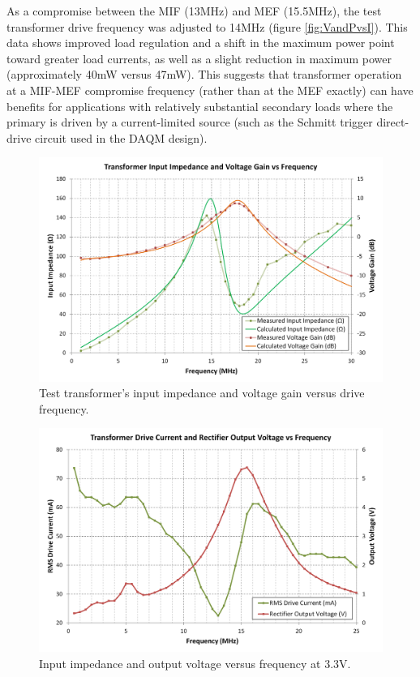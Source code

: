 \documentclass[conference]{IEEEtran}
\begin{document}
	As a compromise between the MIF (13MHz) and MEF (15.5MHz), the test transformer drive frequency was adjusted to 14MHz (figure \ref{fig:VandPvsI}).  This data shows improved load regulation and a shift in the maximum power point toward greater load currents, as well as a slight reduction in maximum power (approximately 40mW versus 47mW).  This suggests that transformer operation at a MIF-MEF compromise frequency (rather than at the MEF exactly) can have benefits for applications with relatively substantial secondary loads where the primary is driven by a current-limited source (such as the Schmitt trigger direct-drive circuit used in the DAQM design).

	\begin{figure}[t]
		\centering
		\includegraphics[width=1.0\columnwidth]{./img/NoRectTF}
		\caption{Test transformer's input impedance and voltage gain versus drive frequency.}
		\label{fig:NoRect}
	\end{figure}

	\begin{figure}[t]
		\centering
		\includegraphics[width=1\columnwidth]{./img/ZandVoutVsF_3V3}
		\caption{Input impedance and output voltage versus frequency at 3.3V.}
		\label{fig:ZandVvsF}
	\end{figure}
	
\end{document}
